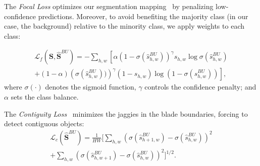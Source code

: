 The \textit{Focal Loss} \label{sec:focal-loss} optimizes our segmentation mapping~\cite{focal} by penalizing low-confidence predictions. Moreover, to avoid benefiting the majority class (in our case, the background) relative to the minority class, we apply weights to each class: 

\vspace{-0.2cm}
\begin{gather} 
\label{focal_loss}
    \mathcal L_{f}(\mathbf{S}, {\hat{\mathbf{S}}}^{BU}) = -\sum_{h,w} \left[ \alpha \left(1-\sigma(\hat s^{BU}_{h,w})\right)^\gamma s_{h,w}\log\sigma(\hat s^{BU}_{h,w})  \right. \nonumber \\ 
   \left.  + (1 - \alpha) \left(\sigma(\hat s^{BU}_{h,w}))\right)^\gamma (1-s_{h,w})\log(1-\sigma(\hat s^{BU}_{h,w}))    \right],
\end{gather}
where $\sigma(\cdot)$ denotes the sigmoid function, $\gamma$ controls the confidence penalty; and $\alpha$ sets the class balance.  





The \textit{Contiguity Loss}~\cite{cont} minimizes the jaggies in the blade boundaries, forcing to detect contiguous objects:
\begin{align}
    \mathcal L_{c}({\hat{\mathbf{S}}}^{BU}) = \frac{1}{HW} \Big[ \sum_{h,w} \left(   \sigma(\hat s^{BU}_{h+1,w})-\sigma(\hat s^{BU}_{h,w})  \right)^2 \nonumber \\
+ \sum_{h,w} \left(    \sigma(\hat s^{BU}_{h,w+1})-\sigma(\hat s^{BU}_{h,w})   \right)^2 \Big]^{1/2} .
\end{align}



